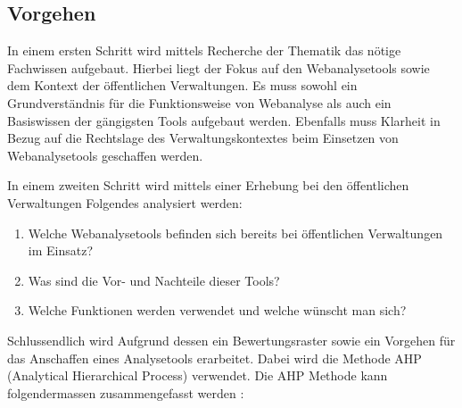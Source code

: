 \subsection{Vorgehen}

In einem ersten Schritt wird mittels Recherche der Thematik das nötige Fachwissen aufgebaut. Hierbei liegt der Fokus auf den Webanalysetools sowie dem Kontext der öffentlichen Verwaltungen. Es muss sowohl ein Grundverständnis für die Funktionsweise von Webanalyse als auch ein Basiswissen der gängigsten Tools aufgebaut werden. Ebenfalls muss Klarheit in Bezug auf die Rechtslage des Verwaltungskontextes beim Einsetzen von Webanalysetools geschaffen werden. 

In einem zweiten Schritt wird mittels einer Erhebung bei den öffentlichen Verwaltungen Folgendes analysiert werden:

\begin{enumerate}
    \item Welche Webanalysetools befinden sich bereits bei öffentlichen Verwaltungen im Einsatz?
    \item Was sind die Vor- und Nachteile dieser Tools?
    \item Welche Funktionen werden verwendet und welche wünscht man sich?
\end{enumerate}

Schlussendlich wird Aufgrund dessen ein Bewertungsraster sowie ein Vorgehen für das Anschaffen eines Analysetools erarbeitet. Dabei wird die Methode AHP (Analytical Hierarchical Process)  verwendet. 
Die AHP Methode kann folgendermassen zusammengefasst werden \parencite[S. 176]{nakatani2011toolselectionmethod}:

